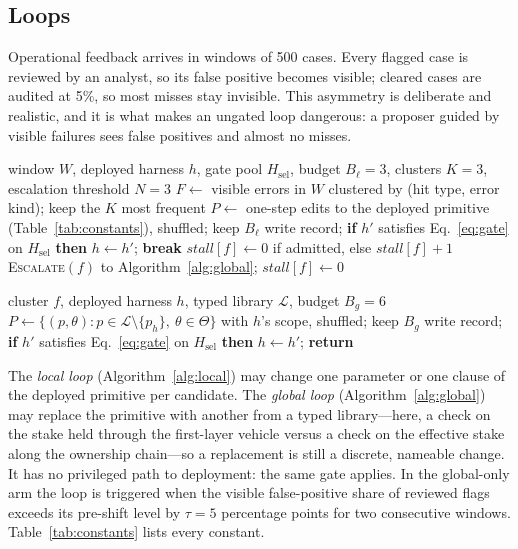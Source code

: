 \documentclass[11pt]{article}
\newcommand{\Hsel}{H_{\mathrm{sel}}}
\begin{document}
\subsection{Loops}

Operational feedback arrives in windows of 500 cases. Every flagged case is reviewed by an analyst, so its false positive becomes visible; cleared cases are audited at 5\%, so most misses stay invisible. This asymmetry is deliberate and realistic, and it is what makes an ungated loop dangerous: a proposer guided by visible failures sees false positives and almost no misses.

\begin{algorithm}[t]
\caption{Local loop, per window}
\label{alg:local}
\begin{algorithmic}[1]
\Require window $W$, deployed harness $h$, gate pool $\Hsel$, budget $B_\ell=3$, clusters $K=3$, escalation threshold $N=3$
\State $F \gets$ visible errors in $W$ clustered by (hit type, error kind); keep the $K$ most frequent
  \State $P \gets$ one-step edits to the deployed primitive (Table~\ref{tab:constants}), shuffled; keep $B_\ell$
    \State write record; \textbf{if} $h'$ satisfies Eq.~\eqref{eq:gate} on $\Hsel$ \textbf{then} $h \gets h'$; \textbf{break}
  \EndFor
  \State $\mathit{stall}[f] \gets 0$ if admitted, else $\mathit{stall}[f]+1$
   \textsc{Escalate}$(f)$ to Algorithm~\ref{alg:global}; $\mathit{stall}[f] \gets 0$ \EndIf
\EndFor
\end{algorithmic}
\end{algorithm}

\begin{algorithm}[t]
\caption{Global loop, on escalation (dual loop) or on threshold breach (global-only arm)}
\label{alg:global}
\begin{algorithmic}[1]
\Require cluster $f$, deployed harness $h$, typed library $\mathcal{L}$, budget $B_g=6$
\State $P \gets \{(p,\theta): p \in \mathcal{L}\setminus\{p_h\},\ \theta \in \Theta\}$ with $h$'s scope, shuffled; keep $B_g$
  \State write record; \textbf{if} $h'$ satisfies Eq.~\eqref{eq:gate} on $\Hsel$ \textbf{then} $h \gets h'$; \textbf{return}
\EndFor
\end{algorithmic}
\end{algorithm}

The \emph{local loop} (Algorithm~\ref{alg:local}) may change one parameter or one clause of the deployed primitive per candidate. The \emph{global loop} (Algorithm~\ref{alg:global}) may replace the primitive with another from a typed library---here, a check on the stake held through the first-layer vehicle versus a check on the effective stake along the ownership chain---so a replacement is still a discrete, nameable change. It has no privileged path to deployment: the same gate applies. In the global-only arm the loop is triggered when the visible false-positive share of reviewed flags exceeds its pre-shift level by $\tau = 5$ percentage points for two consecutive windows. Table~\ref{tab:constants} lists every constant.
\end{document}
